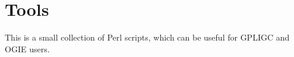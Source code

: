 


\section{Tools}

This is a small collection of Perl scripts, which can be useful for GPLIGC and OGIE users.



%
%
%

